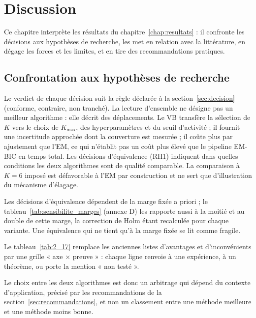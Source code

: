 \chapter{Discussion}\label{chap:discussion}
Ce chapitre interprète les résultats du chapitre~\ref{chap:resultats} : il confronte les décisions aux hypothèses de recherche, les met en relation avec la littérature, en dégage les forces et les limites, et en tire des recommandations pratiques.

\section{Confrontation aux hypothèses de recherche}\label{sec:bilan}

Le verdict de chaque décision suit la règle déclarée à la section~\ref{sec:decision} (conforme, contraire, non tranché). La lecture d'ensemble ne désigne pas un meilleur algorithme : elle décrit des déplacements. Le VB transfère la sélection de $K$ vers le choix de $K_{\max}$, des hyperparamètres et du seuil d'activité ; il fournit une incertitude approchée dont la couverture est mesurée ; il coûte plus par ajustement que l'EM, ce qui n'établit pas un coût plus élevé que le pipeline EM-BIC en temps total. Les décisions d'équivalence (RH1) indiquent dans quelles conditions les deux algorithmes sont de qualité comparable. La comparaison à $K = 6$ imposé est défavorable à l'EM par construction et ne sert que d'illustration du mécanisme d'élagage.

Les décisions d'équivalence dépendent de la marge fixée a priori ; le tableau~\ref{tab:sensibilite_marges} (annexe D) les rapporte aussi à la moitié et au double de cette marge, la correction de Holm étant recalculée pour chaque variante. Une équivalence qui ne tient qu'à la marge fixée se lit comme fragile.


Le tableau~\ref{tab:2_17} remplace les anciennes listes d'avantages et d'inconvénients par une grille « axe $\times$ preuve » : chaque ligne renvoie à une expérience, à un théorème, ou porte la mention « non testé ».

Le choix entre les deux algorithmes est donc un arbitrage qui dépend du contexte d'application, précisé par les recommandations de la section~\ref{sec:recommandations}, et non un classement entre une méthode meilleure et une méthode moins bonne.

